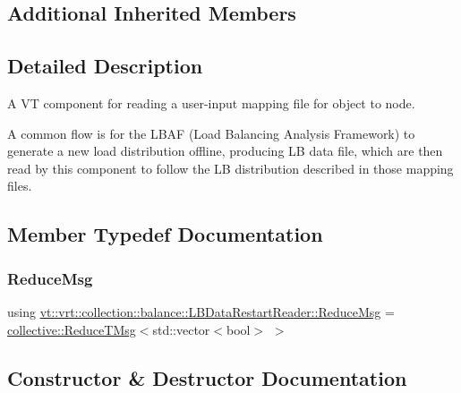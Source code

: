 \subsection*{Additional Inherited Members}


\subsection{Detailed Description}
A VT component for reading a user-\/input mapping file for object to node. 

A common flow is for the L\+B\+AF (Load Balancing Analysis Framework) to generate a new load distribution offline, producing LB data file, which are then read by this component to follow the LB distribution described in those mapping files. 

\subsection{Member Typedef Documentation}
\mbox{\label{structvt_1_1vrt_1_1collection_1_1balance_1_1_l_b_data_restart_reader_a59e2b9e568683c89c9af430adacba420}} 
\subsubsection{\texorpdfstring{Reduce\+Msg}{ReduceMsg}}
{\footnotesize\ttfamily using \hyperlink{structvt_1_1vrt_1_1collection_1_1balance_1_1_l_b_data_restart_reader_a59e2b9e568683c89c9af430adacba420}{vt\+::vrt\+::collection\+::balance\+::\+L\+B\+Data\+Restart\+Reader\+::\+Reduce\+Msg} =  \hyperlink{namespacevt_1_1collective_a28b82d5d48c9bc6e4fd738fcbf9e0f62}{collective\+::\+Reduce\+T\+Msg}$<$std\+::vector$<$bool$>$ $>$}



\subsection{Constructor \& Destructor Documentation}
\mbox{\label{structvt_1_1vrt_1_1collection_1_1balance_1_1_l_b_data_restart_reader_a66d7aad803c86006eb72e95d46aa945a}} 
